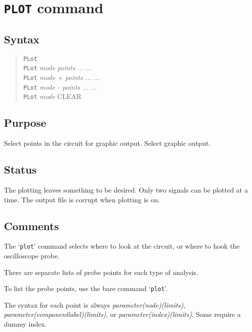 \section{{\tt PLOT} command}
\subsection{Syntax}
\begin{verse}
{\tt PLot}\\
{\tt PLot} {\it mode points ...} ...\\
{\tt PLot} {\it mode + points ...} ...\\
{\tt PLot} {\it mode - points ...} ...\\
{\tt PLot} {\it mode} CLEAR
\end{verse}
\subsection{Purpose}

Select points in the circuit for graphic output.  Select graphic output.
\subsection{Status}

The plotting leaves something to be desired.  Only two signals can be
plotted at a time.  The output file is corrupt when plotting is on.
\subsection{Comments}

The `{\tt plot}' command selects where to look at the circuit, or where to
hook the oscilloscope probe.

There are separate lists of probe points for each type of analysis.

To list the probe points, use the bare command `{\tt plot}'.

The syntax for each point is always {\it parameter(node)(limits)},
{\it parameter(componentlabel)(limits)}, or {\it parameter(index)(limits)}.
Some require a dummy index.

